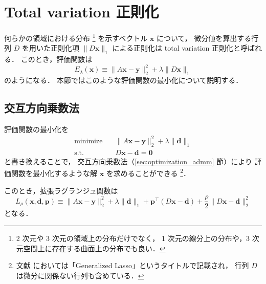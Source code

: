 %

\section{Total variation 正則化}

何らかの領域における分布
\footnote{2 次元や 3 次元の領域上の分布だけでなく，%
    1 次元の線分上の分布や，3 次元空間上に存在する曲面上の分布でも良い．}
を示すベクトル $\bm{x}$ について，
微分値を算出する行列 $D$ を用いた正則化項 $\|D \bm{x}\|_1$ による正則化は
total variation 正則化と呼ばれる．
このとき，評価関数は
\begin{equation}
    E_{\lambda}(\bm{x}) \equiv \|A \bm{x} - \bm{y}\|_2^2 + \lambda \|D \bm{x}\|_1
\end{equation}
のようになる．
本節ではこのような評価関数の最小化について説明する．

\subsection{交互方向乗数法}

評価関数の最小化を
\begin{align}
    \text{minimize} \hspace{1em} & \|A \bm{x} - \bm{y}\|_2^2 + \lambda \|\bm{d}\|_1 \\
    \text{s.t.} \hspace{1em}     & D \bm{x} - \bm{d} = \bm{0}
\end{align}
と書き換えることで，
交互方向乗数法（\ref{sec:optimization_admm} 節）により
評価関数を最小化するような解 $\bm{x}$ を求めることができる \cite{Boyd2010}
\footnote{文献 \cite{Boyd2010} においては「Generalized Lasso」というタイトルで記載され，%
    行列 $D$ は微分に関係ない行列も含めている．}．

このとき，拡張ラグランジュ関数は
\begin{equation}
    L_{\rho}(\bm{x}, \bm{d}, \bm{p}) \equiv
    \|A \bm{x} - \bm{y}\|_2^2 + \lambda \|\bm{d}\|_1
    + \bm{p}^\top (D \bm{x} - \bm{d})
    + \frac{\rho}{2} \|D \bm{x} - \bm{d}\|_2^2
\end{equation}
となる．

